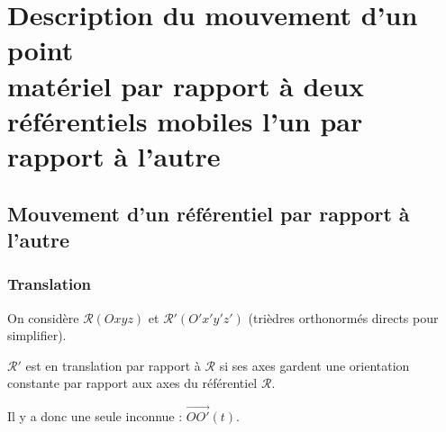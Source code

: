 \section[Description du mouvement d'un point matériel]{Description du mouvement d'un point\\matériel par rapport à deux référentiels mobiles l'un par rapport à l'autre}

    \subsection{Mouvement d'un référentiel par rapport à l'autre}

        \subsubsection{Translation}

            On considère $\mathcal{R}(Oxyz)$ et $\mathcal{R}'(O'x'y'z')$ (trièdres orthonormés directs pour simplifier).

            \begin{definition}
                $\mathcal{R}'$ est en translation par rapport à $\mathcal{R}$ si ses axes gardent une orientation constante par rapport aux axes du référentiel $\mathcal{R}$.
            \end{definition}

            Il y a donc une seule inconnue : $\vec{OO'}(t)$.

